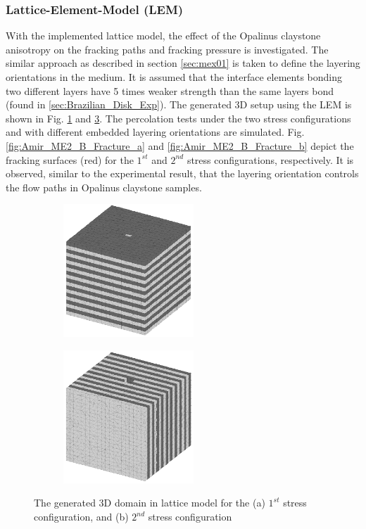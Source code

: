 \subsubsection*{Lattice-Element-Model (LEM)}

With the implemented lattice model, the effect of the Opalinus claystone anisotropy on the fracking paths and fracking pressure is investigated. The similar approach as described in section \ref {sec:mex01} is taken to define the layering orientations in the medium. It is assumed that the interface elements bonding two different layers have 5 times weaker strength than the same layers bond (found in \ref{sec:Brazilian_Disk_Exp}). The generated 3D setup using the LEM is shown in Fig. \ref{fig:Amir_Percolation_Setup_a} and \ref{fig:Amir_Percolation_Setup_b}. The percolation tests under the two stress configurations and with different embedded layering orientations are simulated. Fig. \ref{fig:Amir_ME2_B_Fracture_a} and \ref{fig:Amir_ME2_B_Fracture_b} depict the fracking surfaces (red) for the $1^{st}$ and $2^{nd}$ stress configurations, respectively. It is observed, similar to the experimental result, that the layering orientation controls the flow paths in Opalinus claystone samples. 


\begin{figure}[!ht]
\begin{subfigure}[c]{0.48\textwidth}
\centering
\includegraphics[width=5cm,height=5cm]{figures/Amir_Percolation_Setup_a.png}
\subcaption{}
\label{fig:Amir_Percolation_Setup_a}
\end{subfigure}
\hfill
\begin{subfigure}[c]{0.48\textwidth}
\centering
\includegraphics[width=5cm,height=5cm]{figures/Amir_Percolation_Setup_b.png}
\subcaption{}
\label{fig:Amir_Percolation_Setup_b}
\end{subfigure}
\caption{The generated 3D domain in lattice model for the (a) $1^{st}$ stress configuration, and (b) $2^{nd}$ stress configuration}
\end{figure}


